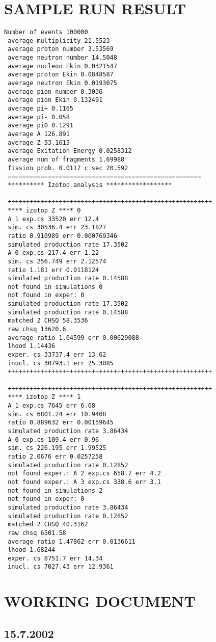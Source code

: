 \begin{appendix}
\section{SAMPLE RUN RESULT}
\scriptsize
\begin{verbatim}
Number of events 100000
 average multiplicity 21.5523
 average proton number 3.53569
 average neutron number 14.5048
 average nucleon Ekin 0.0321547
 average proton Ekin 0.0848587
 average neutron Ekin 0.0193075
 average pion number 0.3036
 average pion Ekin 0.132491
 average pi+ 0.1165
 average pi- 0.058
 average pi0 0.1291
 average A 126.891
 average Z 53.1615
 average Exitation Energy 0.0258312
 average num of fragments 1.69988
 fission prob. 0.0117 c.sec 20.592
 =====================================================
 ********** Izotop analysis ******************

 ++++++++++++++++++++++++++++++++++++++++++++++++++++++++
 **** izotop Z **** 0
 A 1 exp.cs 33520 err 12.4
 sim. cs 30536.4 err 23.1827
 ratio 0.910989 err 0.000769346
 simulated production rate 17.3502
 A 0 exp.cs 217.4 err 1.22
 sim. cs 256.749 err 2.12574
 ratio 1.181 err 0.0118124
 simulated production rate 0.14588
 not found in simulations 0
 not found in exper: 0
 simulated production rate 17.3502
 simulated production rate 0.14588
 matched 2 CHSQ 58.3536
 raw chsq 13620.6
 average ratio 1.04599 err 0.00629088
 lhood 1.14436
 exper. cs 33737.4 err 13.62
 inucl. cs 30793.1 err 25.3085
 ++++++++++++++++++++++++++++++++++++++++++++++++++++++++

 ++++++++++++++++++++++++++++++++++++++++++++++++++++++++
 **** izotop Z **** 1
 A 1 exp.cs 7645 err 6.08
 sim. cs 6801.24 err 10.9408
 ratio 0.889632 err 0.00159645
 simulated production rate 3.86434
 A 0 exp.cs 109.4 err 0.96
 sim. cs 226.195 err 1.99525
 ratio 2.0676 err 0.0257258
 simulated production rate 0.12852
 not found exper.: A 2 exp.cs 658.7 err 4.2
 not found exper.: A 3 exp.cs 338.6 err 3.1
 not found in simulations 2
 not found in exper: 0
 simulated production rate 3.86434
 simulated production rate 0.12852
 matched 2 CHSQ 40.3162
 raw chsq 6501.58
 average ratio 1.47862 err 0.0136611
 lhood 1.68244
 exper. cs 8751.7 err 14.34
 inucl. cs 7027.43 err 12.9361
\end{verbatim}
\normalsize

\section{WORKING DOCUMENT}
\subsection{15.7.2002}


\end{appendix}

